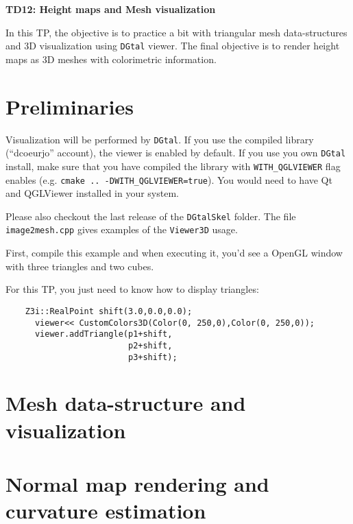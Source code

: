 \documentclass[a4paper, 11pt]{article}
\title{}
\author{}
\date{}
\begin{document}
\begin{center}
	\LARGE \textbf{TD12: Height maps and Mesh visualization}
\end{center}

\bigskip
\par In this TP, the objective is to practice a bit with triangular
mesh data-structures and 3D visualization using \texttt{DGtal}
viewer. The final objective is to render height maps as 3D meshes with
colorimetric information.

\section{Preliminaries}

Visualization will be performed by \texttt{DGtal}. If you use the
compiled library (``dcoeurjo'' account), the viewer is enabled by
default. If you use you own \texttt{DGtal} install, make sure that you
have compiled the library with \texttt{WITH\_QGLVIEWER} flag enables
(e.g. \texttt{cmake .. -DWITH\_QGLVIEWER=true}). You would need to
have Qt and QGLViewer installed in your system.

Please also checkout the last release of the \texttt{DGtalSkel} folder. The
file \texttt{image2mesh.cpp} gives examples of the \texttt{Viewer3D}
usage.

First, compile this example and when executing it, you'd see a OpenGL
window with three triangles and two cubes.

For this TP, you just need to know how to display triangles:
\begin{verbatim}
    Z3i::RealPoint shift(3.0,0.0,0.0);
      viewer<< CustomColors3D(Color(0, 250,0),Color(0, 250,0));
      viewer.addTriangle(p1+shift,
                         p2+shift,
                         p3+shift);

\end{verbatim}


\section{Mesh data-structure and visualization}



\section{Normal map rendering and curvature estimation}
\end{document}

